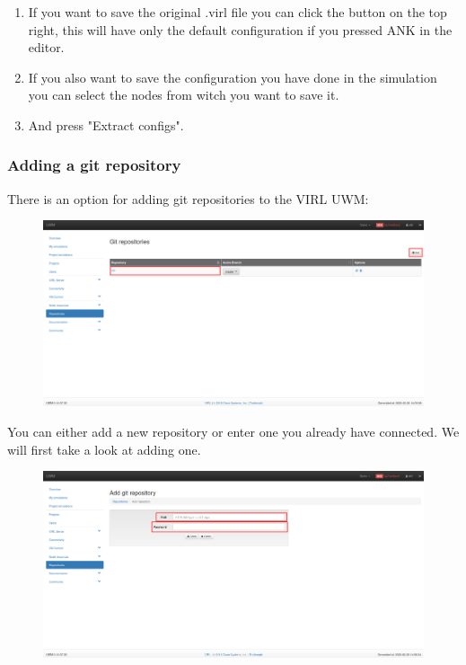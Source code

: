 \documentclass{article}
\begin{document}
\begin{enumerate}
	\item If you want to save the original .virl file you can click the button on the top right, this will have only the default configuration if you pressed ANK in the editor.
	\item If you also want to save the configuration you have done in the simulation you can select the nodes from witch you want to save it. 
	\item And press "Extract configs".
\end{enumerate}

\newpage
\subsubsection{Adding a git repository}
There is an option for adding git repositories to the VIRL UWM:

\begin{figure}[H]
	\centering
	\includegraphics[width=\textwidth]{images/Add_repo.png}
\end{figure}

You can either add a new repository or enter one you already have connected.
We will first take a look at adding one.

\begin{figure}[H]
	\centering
	\includegraphics[width=\textwidth]{images/Adding_new_repo.png}
\end{figure}
\end{document}
